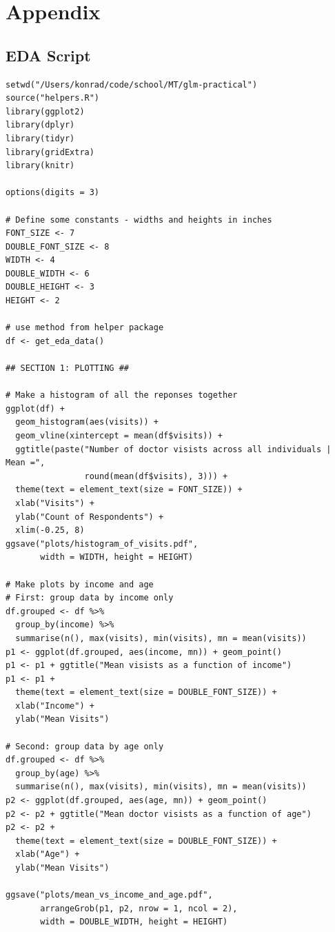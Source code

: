 \documentclass[a4paper,11pt]{article}
\begin{document}
\section{Appendix}
\subsection{EDA Script}
\begin{verbatim}
setwd("/Users/konrad/code/school/MT/glm-practical")
source("helpers.R")
library(ggplot2)
library(dplyr)
library(tidyr)
library(gridExtra)
library(knitr)

options(digits = 3)

# Define some constants - widths and heights in inches
FONT_SIZE <- 7
DOUBLE_FONT_SIZE <- 8
WIDTH <- 4
DOUBLE_WIDTH <- 6
DOUBLE_HEIGHT <- 3
HEIGHT <- 2

# use method from helper package
df <- get_eda_data()

## SECTION 1: PLOTTING ##

# Make a histogram of all the reponses together
ggplot(df) +
  geom_histogram(aes(visits)) +
  geom_vline(xintercept = mean(df$visits)) +
  ggtitle(paste("Number of doctor visists across all individuals | Mean =",
                round(mean(df$visits), 3))) +
  theme(text = element_text(size = FONT_SIZE)) +
  xlab("Visits") +
  ylab("Count of Respondents") +
  xlim(-0.25, 8)
ggsave("plots/histogram_of_visits.pdf",
       width = WIDTH, height = HEIGHT)

# Make plots by income and age
# First: group data by income only
df.grouped <- df %>%
  group_by(income) %>%
  summarise(n(), max(visits), min(visits), mn = mean(visits))
p1 <- ggplot(df.grouped, aes(income, mn)) + geom_point()
p1 <- p1 + ggtitle("Mean visists as a function of income")
p1 <- p1 +
  theme(text = element_text(size = DOUBLE_FONT_SIZE)) +
  xlab("Income") +
  ylab("Mean Visits")

# Second: group data by age only
df.grouped <- df %>%
  group_by(age) %>%
  summarise(n(), max(visits), min(visits), mn = mean(visits))
p2 <- ggplot(df.grouped, aes(age, mn)) + geom_point()
p2 <- p2 + ggtitle("Mean doctor visists as a function of age")
p2 <- p2 +
  theme(text = element_text(size = DOUBLE_FONT_SIZE)) +
  xlab("Age") +
  ylab("Mean Visits")

ggsave("plots/mean_vs_income_and_age.pdf",
       arrangeGrob(p1, p2, nrow = 1, ncol = 2),
       width = DOUBLE_WIDTH, height = HEIGHT)


\end{verbatim}
\end{document}
